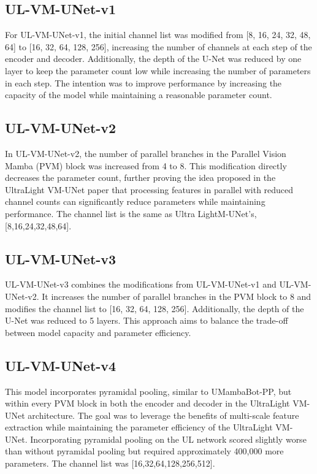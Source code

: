 \documentclass[conference]{IEEEtran}
\begin{document}

\subsection{UL-VM-UNet-v1}
For UL-VM-UNet-v1, the initial channel list was modified from [8, 16, 24, 32, 48, 64] to [16, 32, 64, 128, 256], increasing the number of channels at each step of the encoder and decoder. Additionally, the depth of the U-Net was reduced by one layer to keep the parameter count low while increasing the number of parameters in each step. The intention was to improve performance by increasing the capacity of the model while maintaining a reasonable parameter count.

\subsection{UL-VM-UNet-v2}
In UL-VM-UNet-v2, the number of parallel branches in the Parallel Vision Mamba (PVM) block was increased from 4 to 8. This modification directly decreases the parameter count, further proving the idea proposed in the UltraLight VM-UNet paper \cite{wu2024ultralight} that processing features in parallel with reduced channel counts can significantly reduce parameters while maintaining performance. The channel list is the same as Ultra LightM-UNet's, [8,16,24,32,48,64].

\subsection{UL-VM-UNet-v3}
UL-VM-UNet-v3 combines the modifications from UL-VM-UNet-v1 and UL-VM-UNet-v2. It increases the number of parallel branches in the PVM block to 8 and modifies the channel list to [16, 32, 64, 128, 256]. Additionally, the depth of the U-Net was reduced to 5 layers. This approach aims to balance the trade-off between model capacity and parameter efficiency.

\subsection{UL-VM-UNet-v4}
This model incorporates pyramidal pooling, similar to UMambaBot-PP, but within every PVM block in both the encoder and decoder in the UltraLight VM-UNet architecture. The goal was to leverage the benefits of multi-scale feature extraction while maintaining the parameter efficiency of the UltraLight VM-UNet. Incorporating pyramidal pooling on the UL network scored slightly worse than without pyramidal pooling but required approximately 400,000 more parameters. The channel list was [16,32,64,128,256,512].
\end{document}
